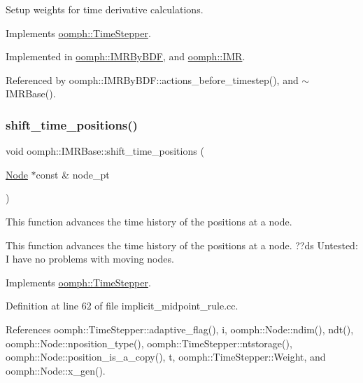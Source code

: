 Setup weights for time derivative calculations. 



Implements \hyperlink{classoomph_1_1TimeStepper_a028fa3a8d3c6db6b0ddf580cb0468d55}{oomph\+::\+Time\+Stepper}.



Implemented in \hyperlink{classoomph_1_1IMRByBDF_a6060b6098113085753083a2dc53723ee}{oomph\+::\+I\+M\+R\+By\+B\+DF}, and \hyperlink{classoomph_1_1IMR_aecea8cd9ec75a6e3efde89e451d714c4}{oomph\+::\+I\+MR}.



Referenced by oomph\+::\+I\+M\+R\+By\+B\+D\+F\+::actions\+\_\+before\+\_\+timestep(), and $\sim$\+I\+M\+R\+Base().

\mbox{\label{classoomph_1_1IMRBase_a61d4487fcf0a9eb7a829b08027a9500f}} 
\subsubsection{\texorpdfstring{shift\+\_\+time\+\_\+positions()}{shift\_time\_positions()}}
{\footnotesize\ttfamily void oomph\+::\+I\+M\+R\+Base\+::shift\+\_\+time\+\_\+positions (\begin{DoxyParamCaption}\item[{\hyperlink{classoomph_1_1Node}{Node} $\ast$const \&}]{node\+\_\+pt }\end{DoxyParamCaption})\hspace{0.3cm}{\ttfamily [virtual]}}



This function advances the time history of the positions at a node. 

This function advances the time history of the positions at a node. ??ds Untested\+: I have no problems with moving nodes. 

Implements \hyperlink{classoomph_1_1TimeStepper_a518b1bee5dc3aae8c5ef13560d1954ac}{oomph\+::\+Time\+Stepper}.



Definition at line 62 of file implicit\+\_\+midpoint\+\_\+rule.\+cc.



References oomph\+::\+Time\+Stepper\+::adaptive\+\_\+flag(), i, oomph\+::\+Node\+::ndim(), ndt(), oomph\+::\+Node\+::nposition\+\_\+type(), oomph\+::\+Time\+Stepper\+::ntstorage(), oomph\+::\+Node\+::position\+\_\+is\+\_\+a\+\_\+copy(), t, oomph\+::\+Time\+Stepper\+::\+Weight, and oomph\+::\+Node\+::x\+\_\+gen().



